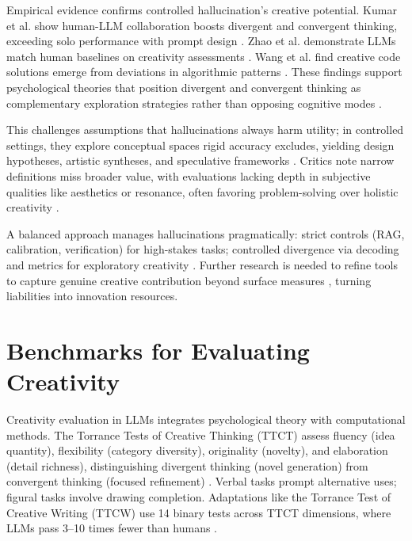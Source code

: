 \documentclass{llncs}
\begin{document}
Empirical evidence confirms controlled hallucination's creative potential. Kumar et al. show human-LLM collaboration boosts divergent and convergent thinking, exceeding solo performance with prompt design \cite{kumar2025human}. Zhao et al. demonstrate LLMs match human baselines on creativity assessments \cite{zhao2024assessing}. Wang et al. find creative code solutions emerge from deviations in algorithmic patterns \cite{wang2024benchmarking}. These findings support psychological theories that position divergent and convergent thinking as complementary exploration strategies rather than opposing cognitive modes \cite{carlini2024divergent}.

This challenges assumptions that hallucinations always harm utility; in controlled settings, they explore conceptual spaces rigid accuracy excludes, yielding design hypotheses, artistic syntheses, and speculative frameworks \cite{springboards2025creativity,sun2024hallucinating,chen2024role}. Critics note narrow definitions miss broader value, with evaluations lacking depth in subjective qualities like aesthetics or resonance, often favoring problem-solving over holistic creativity \cite{sun2024hallucinating,wu2024writingbench,jangra2024evaluating}.

A balanced approach manages hallucinations pragmatically: strict controls (RAG, calibration, verification) for high-stakes tasks; controlled divergence via decoding and metrics for exploratory creativity \cite{chen2024exploring,li2024automated}. Further research is needed to refine tools to capture genuine creative contribution beyond surface measures \cite{sun2024hallucinating,feng2025generative}, turning liabilities into innovation resources.


\section{Benchmarks for Evaluating Creativity}

Creativity evaluation in LLMs integrates psychological theory with computational methods. The Torrance Tests of Creative Thinking (TTCT) \cite{torrance2012torrance} assess fluency (idea quantity), flexibility (category diversity), originality (novelty), and elaboration (detail richness), distinguishing divergent thinking (novel generation) from convergent thinking (focused refinement) \cite{chakrabarty2024art,franceschelli2024creativity,ismayilzada2025creativity}. Verbal tasks prompt alternative uses; figural tasks involve drawing completion. Adaptations like the Torrance Test of Creative Writing (TTCW) use 14 binary tests across TTCT dimensions, where LLMs pass 3–10 times fewer than humans \cite{chakrabarty2024art}.
\end{document}

